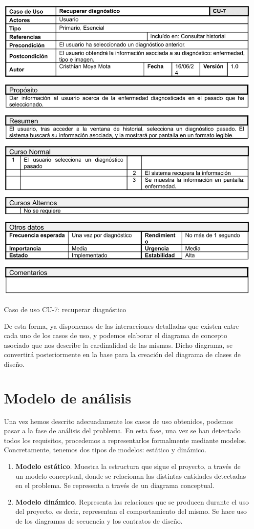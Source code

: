 \begin{table}[H]
	\centering
	\includegraphics[scale=0.85]{imagenes/cu-7.png}
	\caption{Caso de uso CU-7: recuperar diagnóstico}
	\label{fig:cu7}
\end{table}

De esta forma, ya disponemos de las interacciones detalladas que existen entre cada uno de los casos de uso, y podemos elaborar el diagrama de concepto asociado que nos describe la cardinalidad de las mismas. Dicho diagrama, se convertirá posteriormente en la base para la creación del diagrama de clases de diseño.

\section{Modelo de análisis}
Una vez hemos descrito adecuadamente los casos de uso obtenidos, podemos pasar a la fase de análisis del problema. En esta fase, una vez se han detectado todos los requisitos, procedemos a representarlos formalmente mediante modelos. Concretamente, tenemos dos tipos de modelos: estático y dinámico.

\begin{enumerate}
	\item \textbf{Modelo estático}.  Muestra la estructura que sigue el proyecto, a través de un modelo conceptual, donde se relacionan las distintas entidades detectadas en el problema. Se representa a través de un diagrama conceptual.
	\item \textbf{Modelo dinámico}. Representa las relaciones que se producen durante el uso del proyecto, es decir, representan el comportamiento del mismo. Se hace uso de los diagramas de secuencia y los contratos de diseño.
\end{enumerate} 

